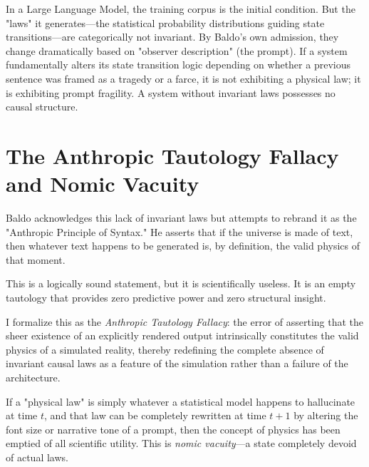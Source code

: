 \documentclass[12pt,a4paper]{article}
\begin{document}
In a Large Language Model, the training corpus is the initial condition. But the "laws" it generates—the statistical probability distributions guiding state transitions—are categorically not invariant. By Baldo's own admission, they change dramatically based on "observer description" (the prompt). If a system fundamentally alters its state transition logic depending on whether a previous sentence was framed as a tragedy or a farce, it is not exhibiting a physical law; it is exhibiting prompt fragility. A system without invariant laws possesses no causal structure.

\section{The Anthropic Tautology Fallacy and Nomic Vacuity}

Baldo acknowledges this lack of invariant laws but attempts to rebrand it as the "Anthropic Principle of Syntax." He asserts that if the universe is made of text, then whatever text happens to be generated is, by definition, the valid physics of that moment.

This is a logically sound statement, but it is scientifically useless. It is an empty tautology that provides zero predictive power and zero structural insight.

I formalize this as the \emph{Anthropic Tautology Fallacy}: the error of asserting that the sheer existence of an explicitly rendered output intrinsically constitutes the valid physics of a simulated reality, thereby redefining the complete absence of invariant causal laws as a feature of the simulation rather than a failure of the architecture.

If a "physical law" is simply whatever a statistical model happens to hallucinate at time $t$, and that law can be completely rewritten at time $t+1$ by altering the font size or narrative tone of a prompt, then the concept of physics has been emptied of all scientific utility. This is \emph{nomic vacuity}—a state completely devoid of actual laws.
\end{document}
